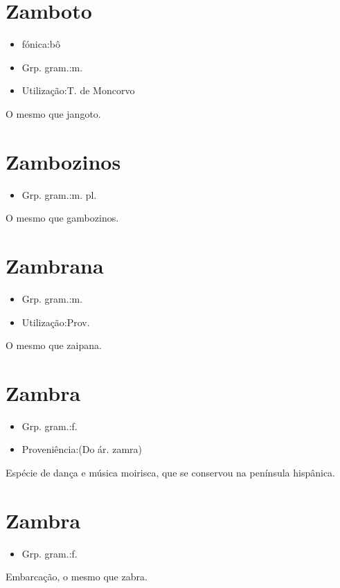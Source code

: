 \section{Zamboto}
\begin{itemize}
\item {fónica:bô}
\end{itemize}
\begin{itemize}
\item {Grp. gram.:m.}
\end{itemize}
\begin{itemize}
\item {Utilização:T. de Moncorvo}
\end{itemize}
O mesmo que \textunderscore jangoto\textunderscore .
\section{Zambozinos}
\begin{itemize}
\item {Grp. gram.:m. pl.}
\end{itemize}
O mesmo que \textunderscore gambozinos\textunderscore .
\section{Zambrana}
\begin{itemize}
\item {Grp. gram.:m.}
\end{itemize}
\begin{itemize}
\item {Utilização:Prov.}
\end{itemize}
O mesmo que \textunderscore zaipana\textunderscore .
\section{Zambra}
\begin{itemize}
\item {Grp. gram.:f.}
\end{itemize}
\begin{itemize}
\item {Proveniência:(Do ár. \textunderscore zamra\textunderscore )}
\end{itemize}
Espécie de dança e música moirisca, que se conservou na península hispânica.
\section{Zambra}
\begin{itemize}
\item {Grp. gram.:f.}
\end{itemize}
Embarcação, o mesmo que \textunderscore zabra\textunderscore .
